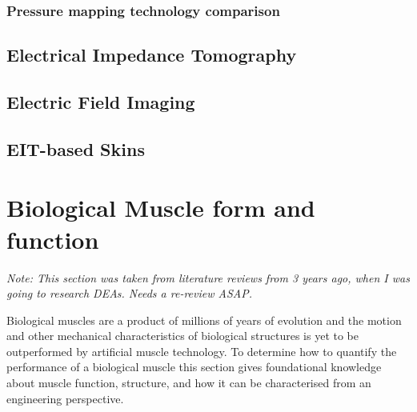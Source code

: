 \subsubsection{Pressure mapping technology comparison}

 \subsection{Electrical Impedance Tomography}

 \subsection{Electric Field Imaging}

 \subsection{EIT-based Skins}


\section{Biological Muscle form and function}
\textit{Note: This section was taken from literature reviews from 3 years ago, when I was going to research DEAs. Needs a re-review ASAP.}

Biological muscles are a product of millions of years of evolution and the motion and other mechanical characteristics of biological structures is yet to be outperformed by artificial muscle technology. To determine how to quantify the performance of a biological muscle this section gives foundational knowledge about muscle function, structure, and how it can be characterised from an engineering perspective. 

